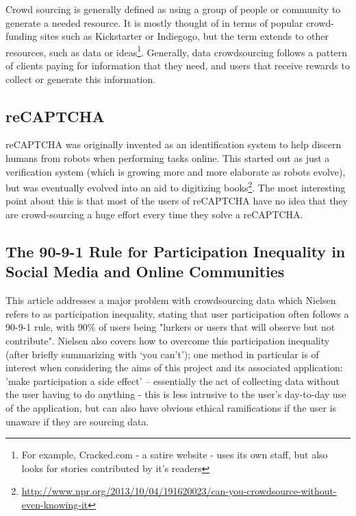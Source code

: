 \documentclass[11pt]{informatics-report}
\begin{document}
Crowd sourcing is generally defined as using a group of people or community to generate a needed resource. It is mostly thought of in terms of popular crowd-funding sites such as Kickstarter or Indiegogo, but the term extends to other resources, such as data or ideas\footnote{For example, Cracked.com - a satire website - uses its own staff, but also looks for stories contributed by it's readers}. Generally, data crowdsourcing follows a pattern of clients paying for information that they need, and users that receive rewards to collect or generate this information.

\subsection{reCAPTCHA} 

reCAPTCHA was originally invented as an identification system to help discern humans from robots when performing tasks online. This started out as just a verification system (which is growing more and more elaborate as robots evolve), but was eventually evolved into an aid to digitizing books\footnote{\url{http://www.npr.org/2013/10/04/191620023/can-you-crowdsource-without-even-knowing-it}}. The most interesting point about this is that most of the users of reCAPTCHA have no idea that they are crowd-sourcing a huge effort every time they solve a reCAPTCHA.

\subsection{The 90-9-1 Rule for Participation Inequality in Social Media and Online Communities\cite{participationinequality}}

This article addresses a major problem with crowdsourcing data which Nielsen refers to as participation inequality, stating that user participation often follows a 90-9-1 rule, with 90\% of users being "lurkers or users that will observe but not contribute"\cite{participationinequality}. Nielsen also covers how to overcome this participation inequality (after briefly summarizing with ‘you can’t’); one method in particular is of interest when considering the aims of this project and its associated application: 'make participation a side effect'  – essentially the act of collecting data without the user having to do anything - this is less intrusive to the user’s day-to-day use of the application, but can also have obvious ethical ramifications if the user is unaware if they are sourcing data.
\end{document}
